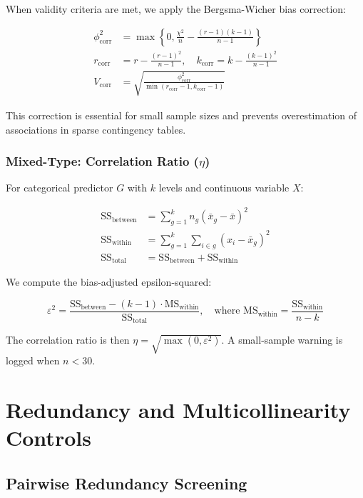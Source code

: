 When validity criteria are met, we apply the Bergsma-Wicher bias correction:

\begin{align}
\phi^2_{\text{corr}} &= \max\left\{0, \frac{\chi^2}{n} - \frac{(r-1)(k-1)}{n-1}\right\} \\
r_{\text{corr}} &= r - \frac{(r-1)^2}{n-1}, \quad k_{\text{corr}} = k - \frac{(k-1)^2}{n-1} \\
V_{\text{corr}} &= \sqrt{\frac{\phi^2_{\text{corr}}}{\min(r_{\text{corr}}-1, k_{\text{corr}}-1)}}
\label{eq:cramers-v}
\end{align}

This correction is essential for small sample sizes and prevents overestimation of associations in sparse contingency tables.

\subsubsection{Mixed-Type: Correlation Ratio ($\eta$)}

For categorical predictor $G$ with $k$ levels and continuous variable $X$:

\begin{align}
\text{SS}_{\text{between}} &= \sum_{g=1}^{k} n_g(\bar{x}_g - \bar{x})^2 \\
\text{SS}_{\text{within}} &= \sum_{g=1}^{k} \sum_{i \in g} (x_i - \bar{x}_g)^2 \\
\text{SS}_{\text{total}} &= \text{SS}_{\text{between}} + \text{SS}_{\text{within}}
\end{align}

We compute the bias-adjusted epsilon-squared:

\begin{equation}
\varepsilon^2 = \frac{\text{SS}_{\text{between}} - (k-1) \cdot \text{MS}_{\text{within}}}{\text{SS}_{\text{total}}}, \quad \text{where } \text{MS}_{\text{within}} = \frac{\text{SS}_{\text{within}}}{n-k}
\label{eq:epsilon-squared}
\end{equation}

The correlation ratio is then $\eta = \sqrt{\max(0, \varepsilon^2)}$. A small-sample warning is logged when $n < 30$.

\section{Redundancy and Multicollinearity Controls}

\subsection{Pairwise Redundancy Screening}

